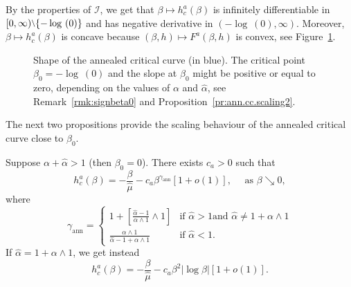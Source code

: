 \documentclass[10pt]{amsart}
\theoremstyle{definition}\newtheorem{defi}[theo]{Definition}\newtheorem{rema}[theo]{Remark}\newtheorem{exam}[theo]{Example}\newtheorem{exem}[theo]{Example}\newtheorem{nota}[theo]{Notation}
\newcommand{\cI}{{\ensuremath{\mathcal I}}}
\newcommand{\ga}{\alpha}
\newcommand{\gb}{\beta}
\newcommand{\ha}{\hat\ga}
\newcommand{\hmu}{\hat \mu}
\newcommand{\gann}{\gamma_{\mathrm{ann}}}
\newcommand{\sm}{{\raise0.3ex\hbox{$\scriptstyle \setminus$}}}
\begin{document}
By the properties of $\cI$, we get that $\gb \mapsto h_c^a(\gb)$ is infinitely differentiable in $[0,\infty) \sm \{- \log~(0)\}$ and has negative derivative in $(- \log~(0),\infty)$. Moreover, $\gb \mapsto h_c^a(\gb)$ is concave because $(\gb,h) \mapsto F^a(\gb,h)$ is convex, see Figure~\ref{fig.ann.cc}.

\begin{figure}
\begin{center}
\end{center}
\caption{\label{fig.ann.cc}
Shape of the annealed critical curve (in blue). The critical point $\gb_0 = -\log~(0)$ and the slope at $\gb_0$ might be positive or equal to zero, depending on the values of $\ga$ and $\hat\ga$, see Remark~\ref{rmk:signbeta0} and Proposition~\ref{pr:ann.cc.scaling2}.}
\end{figure}

The next two propositions provide the scaling behaviour of the annealed critical curve close to $\gb_0$.

\begin{prop}\label{pr:ann.cc.scaling}
Suppose $\ga + \ha > 1$ (then $\gb_0 = 0$). There exists $c_a > 0$ such that
\begin{equation}
h_c^a(\gb) = - \frac{\gb}{\hmu} - c_a \gb^{\gann}[1 + o(1)], \quad \text{ as }\gb \searrow 0,
\end{equation}
where
\begin{equation}\label{eq:defgann}
\gann =
\begin{cases}
1 + \left[\frac{\ha -1}{\ga \wedge 1} \wedge 1 \right] & \text{if } \ha > 1 \text{and } \ha \neq 1 + \ga \wedge 1\\[0.3em]
\frac{\ga \wedge 1}{\ha -1 + \ga \wedge 1} & \text{if } \ha < 1.
\end{cases}
\end{equation}
If $\ha = 1 + \ga \wedge 1$, we get instead
\begin{equation}
h_c^a(\gb) = - \frac{\gb}{\hmu} - c_a \gb^2 |{\log \gb}|[1 + o(1)].
\end{equation}
\end{prop}
\end{document}
